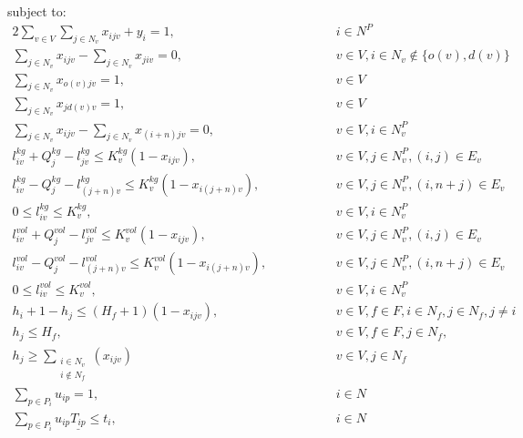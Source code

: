 \documentclass[../main.tex]{subfiles}
\begin{document}
subject to:
\begingroup
    \allowdisplaybreaks
\begin{alignat} {2}
    \sum_{v\in V}\sum_{j\in N_v}x_{ijv} + y_i = 1,	        	&\quad\quad\quad&& 	 i \in N^P 				\label{eq:2} 	\\[4pt]
    \sum_{j\in N_v}x_{ijv} - \sum_{j\in N_v}x_{jiv} = 0,		& 	&&	v \in V, i\in N_v \notin \{o(v), d(v)\}		\label{eq:3} 	\\[4pt]
    \sum_{j\in N_v}x_{o(v)jv} = 1,				        & 	&&	v \in V 					\label{eq:4}	\\[4pt]
    \sum_{j\in N_v}x_{j d(v)v} = 1,					& 	&&	v \in V 					\label{eq:5}	\\[4pt]
    \sum_{j\in N_v}x_{ijv} - \sum_{j\in N_v}x_{(i+n)jv} = 0,  	        & 	&&	v \in V, i\in N^P_v 				\label{eq:6}	\\[4pt]
    l_{iv}^{kg} + Q_j^{kg} - l_{jv}^{kg} \leq K_v^{kg}(1-x_{ijv}),      & 	&&	v \in V, j\in N_v^P, (i,j) \in E_v 		\label{eq:7} 	\\[8pt]
    l_{iv}^{kg} - Q_j^{kg} - l_{(j+n)v}^{kg} \leq K_v^{kg}(1-x_{i(j+n)v}),& 	&&	v \in V ,j\in N_v^P, (i, n+j)\in E_v 		\label{eq:8}	\\[8pt]
    0 \leq l_{iv}^{kg} \leq K_v^{kg},					& 	&&	v \in V, i \in N^P_v 				\label{eq:9}	\\[8pt]
    l_{iv}^{vol} + Q_j^{vol} - l_{jv}^{vol} \leq K_v^{vol}(1-x_{ijv}),      & 	&&	v \in V, j\in N_v^P, (i,j) \in E_v 		\label{eq:10} 	\\[8pt]
    l_{iv}^{vol} - Q_j^{vol} - l_{(j+n)v}^{vol} \leq K_v^{vol}(1-x_{i(j+n)v}),&	&&	v \in V ,j\in N_v^P, (i, n+j)\in E_v 		\label{eq:11}	\\[8pt]
    0 \leq l_{iv}^{vol} \leq K_v^{vol},					& 	&&	v \in V, i \in N^P_v 				\label{eq:12}	\\[8pt]
    h_{i} + 1 - h_{j} \leq (H_f+1)(1-x_{ijv}),				& 	&&	v \in V, f\in F,  i \in N_f, j \in N_f, j\neq i	\label{eq:13}	\\[4pt]
    h_{j} \leq H_f,                                                     & 	&&	v \in V,f\in F, j\in N_f,  			\label{eq:14}	\\[4pt]
    h_{j} \geq \sum_{\substack{i\in N_v\\i{\notin} N_f}}(x_{ijv})       & 	&&	v \in V, j \in N_f                      	\label{eq:15}	\\[4pt]
    \sum_{p\in P_i} u_{ip} = 1,						& 	&& 	i \in N 					\label{eq:16}	\\[4pt]
    \sum_{p\in P_i} u_{ip}\underline{T_{ip}} \leq t_{i},		& 	&&	i \in N 					\label{eq:17}	\\[4pt]

\end{alignat}
\end{document}
